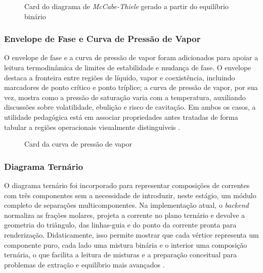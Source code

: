 \begin{figure}[H]
    \centering
    \caption{Card do diagrama de \textit{McCabe-Thiele} gerado a partir do equilíbrio binário}
    \label{fig:viz_mccabe_thiele}
\end{figure}

\subsubsection{Envelope de Fase e Curva de Pressão de Vapor}

O envelope de fase e a curva de pressão de vapor foram adicionados para apoiar a leitura termodinâmica de limites de estabilidade e mudança de fase. O envelope destaca a fronteira entre regiões de líquido, vapor e coexistência, incluindo marcadores de ponto crítico e ponto tríplice; a curva de pressão de vapor, por sua vez, mostra como a pressão de saturação varia com a temperatura, auxiliando discussões sobre volatilidade, ebulição e risco de cavitação. Em ambos os casos, a utilidade pedagógica está em associar propriedades antes tratadas de forma tabular a regiões operacionais visualmente distinguíveis \cite{poling2001,smith2018}.

\begin{figure}[H]
    \centering
    \caption{Card da curva de pressão de vapor}
    \label{fig:viz_pressao_vapor}
\end{figure}

\subsubsection{Diagrama Ternário}

O diagrama ternário foi incorporado para representar composições de correntes com três componentes sem a necessidade de introduzir, neste estágio, um módulo completo de separações multicomponentes. Na implementação atual, o \textit{backend} normaliza as frações molares, projeta a corrente no plano ternário e devolve a geometria do triângulo, das linhas-guia e do ponto da corrente pronta para renderização. Didaticamente, isso permite mostrar que cada vértice representa um componente puro, cada lado uma mistura binária e o interior uma composição ternária, o que facilita a leitura de misturas e a preparação conceitual para problemas de extração e equilíbrio mais avançados \cite{seader2016,devoe2014}.

